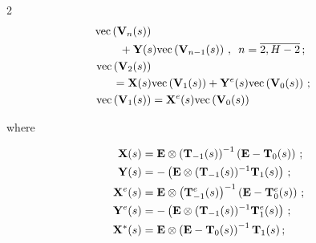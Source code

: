 \begin{multicols}{2}
\begin{align}
\mathrm{vec}\left(\bmx{V}_n(s)\right)\notag\\


&\hspace*{-10mm}{}+\bmx{Y}(s)


\mathrm{vec}\left(\bmx{V}_{n-1}(s)\right)\,,\enskip


n=\overline{2,H-2}\,;


\\


\label{2}


\mathrm{vec}\left(\bmx{V}_{2}(s)\right)&{}\notag\\


&\hspace*{-12mm}{}=


\bmx{X}(s) \mathrm{vec}\left(\bmx{V}_1(s)\right)+


\bmx{Y}^e(s) \mathrm{vec}\left(\bmx{V}_{0}(s)\right)\,;


\\


\label{0}


\mathrm{vec}\left(\bmx{V}_{1}(s)\right) &= \bmx{X}^e(s) \mathrm{vec}\left(\bmx{V}_{0}(s)\right)


\end{align}


where


\begin{align*}


\bmx{X}(s)&= \bmx{E} \otimes \left(\bmx{T}_{-1}(s)\right)^{-1}


\left(\bmx{E}-\bmx{T}_0(s)\right)\,; \\


 \bmx{Y}(s)&= - \left(\bmx{E} \otimes (\bmx{T}_{-1}(s) )^{-1}


\bmx{T}_1(s)\right)\,;


\\


\bmx{X}^e(s)&= \bmx{E} \otimes \left(\bmx{T}^e_{-1}(s) \right)^{-1}


\left(\bmx{E}-\bmx{T}^e_0(s)\right)\,; \\


\bmx{Y}^e(s)&=- \left(\bmx{E} \otimes (\bmx{T}_{-1}(s) )^{-1}


\bmx{T}^e_1(s)\right)\,;\\


\bmx{X}^*(s)&=


\bmx{E} \otimes \left(\bmx{E}-\bmx{T}_0(s)\right)^{-1} \bmx{T}_{1}(s) \,; \\ 



\end{align*}
\end{multicols}

